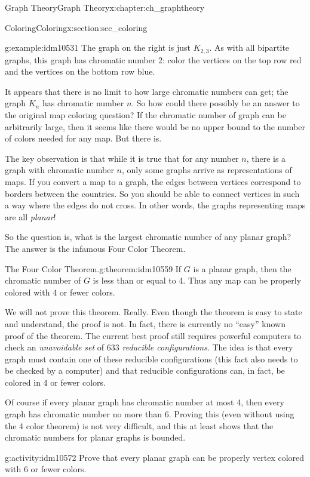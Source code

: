 \documentclass[oneside,10pt,]{book}
\numberwithin{equation}{chapter}
\begin{document}
\begin{chapterptx}{Graph Theory}{}{Graph Theory}{}{}{x:chapter:ch_graphtheory}
\begin{sectionptx}{Coloring}{}{Coloring}{}{}{x:section:sec_coloring}
\begin{introduction}{}
\begin{example}{}{g:example:idm10531}
The graph on the right is just \(K_{2,3}\). As with all bipartite graphs, this graph has chromatic number 2: color the vertices on the top row red and the vertices on the bottom row blue.%
\end{example}
It appears that there is no limit to how large chromatic numbers can get; the graph \(K_n\) has chromatic number \(n\). So how could there possibly be an answer to the original map coloring question? If the chromatic number of graph can be arbitrarily large, then it seems like there would be no upper bound to the number of colors needed for any map. But there is.%
\par
The key observation is that while it is true that for any number \(n\), there is a graph with chromatic number \(n\), only some graphs arrive as representations of maps. If you convert a map to a graph, the edges between vertices correspond to borders between the countries. So you should be able to connect vertices in such a way where the edges do not cross. In other words, the graphs representing maps are all \emph{planar}!%
\par
So the question is, what is the largest chromatic number of any planar graph? The answer is the infamous Four Color Theorem.%
\begin{theorem}{The Four Color Theorem.}{}{g:theorem:idm10559}%
 If \(G\) is a planar graph, then the chromatic number of \(G\) is less than or equal to 4. Thus any map can be properly colored with 4 or fewer colors.%
\end{theorem}
We will not prove this theorem. Really. Even though the theorem is easy to state and understand, the proof is not. In fact, there is currently no ``easy'' known proof of the theorem. The current best proof still requires powerful computers to check an \emph{unavoidable set} of 633 \emph{reducible configurations}. The idea is that every graph must contain one of these reducible configurations (this fact also needs to be checked by a computer) and that reducible configurations can, in fact, be colored in 4 or fewer colors.%
\par
Of course if every planar graph has chromatic number at most 4, then every graph has chromatic number no more than 6.  Proving this (even without using the 4 color theorem) is not very difficult, and this at least shows that the chromatic numbers for planar graphs is bounded.%
\begin{activity}{}{g:activity:idm10572}%
Prove that every planar graph can be properly vertex colored with 6 or fewer colors.%

\end{activity}
\end{introduction}
\end{sectionptx}
\end{chapterptx}
\end{document}
